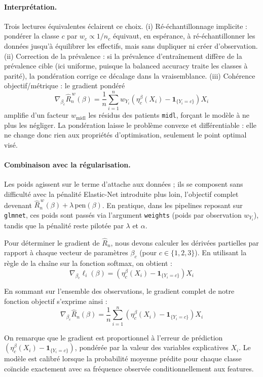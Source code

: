 \documentclass[a4paper,11pt]{paper}
\theoremstyle{plain}
\theoremstyle{definition}
\theoremstyle{remark}
\begin{document}
\paragraph{Interprétation.}
Trois lectures équivalentes éclairent ce choix. (i) Ré-échantillonnage implicite : pondérer la classe $c$ par $w_c \propto 1/n_c$ équivaut, en espérance, à ré-échantillonner les données jusqu'à équilibrer les effectifs, mais sans dupliquer ni créer d'observation. (ii) Correction de la prévalence : si la prévalence d'entraînement diffère de la prévalence cible (ici uniforme, puisque la balanced accuracy traite les classes à parité), la pondération corrige ce décalage dans la vraisemblance. (iii) Cohérence objectif/métrique : le gradient pondéré
$$
    \nabla_{\beta_c} \hat{R}_n^{\,w}(\beta) = \frac{1}{n} \sum_{i=1}^n w_{Y_i}\left( \eta_c^\beta(X_i) - \mathbf{1}_{\{Y_i = c\}} \right) X_i
$$
amplifie d'un facteur $w_{\text{midl}}$ les résidus des patients \texttt{midl}, forçant le modèle à ne plus les négliger. La pondération laisse le problème convexe et différentiable : elle ne change donc rien aux propriétés d'optimisation, seulement le point optimal visé.

\paragraph{Combinaison avec la régularisation.}
Les poids agissent sur le terme d'attache aux données ; ils se composent sans difficulté avec la pénalité Elastic-Net introduite plus loin, l'objectif complet devenant $\hat{R}_n^{\,w}(\beta) + \lambda\,\mathrm{pen}(\beta)$. En pratique, dans les pipelines reposant sur \texttt{glmnet}, ces poids sont passés via l'argument \texttt{weights} (poids par observation $w_{Y_i}$), tandis que la pénalité reste pilotée par $\lambda$ et $\alpha$.

Pour déterminer le gradient de $\hat R_n$, nous devons calculer les dérivées partielles par rapport à chaque vecteur de paramètres $\beta_c$ (pour $c \in \{1, 2, 3\}$). En utilisant la règle de la chaîne sur la fonction softmax, on obtient :
$$\nabla_{\beta_c} \ell_i(\beta) = \left( \eta_c^\beta(X_i) - \mathbf{1}_{\{Y_i = c\}} \right) X_i$$

En sommant sur l'ensemble des observations, le gradient complet de notre fonction objectif s'exprime ainsi :
$$\nabla_{\beta_c} \hat{R}_n(\beta) = \frac{1}{n} \sum_{i=1}^n \left( \eta_c^\beta(X_i) - \mathbf{1}_{\{Y_i = c\}} \right) X_i$$

On remarque que le gradient est proportionnel à l'erreur de prédiction $(\eta_c^\beta(X_i) - \mathbf{1}_{\{Y_i = c\}})$, pondérée par la valeur des variables explicatives $X_i$. Le modèle est calibré lorsque la probabilité moyenne prédite pour chaque classe coïncide exactement avec sa fréquence observée conditionnellement aux features.
\end{document}
